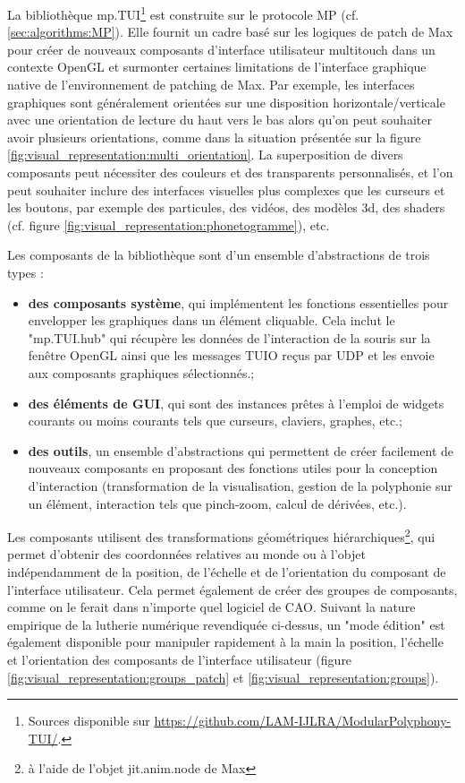 La bibliothèque mp.TUI\footnote{Sources disponible sur \url{https://github.com/LAM-IJLRA/ModularPolyphony-TUI/}.} est construite sur le protocole MP (cf. \ref{sec:algorithms:MP}). Elle fournit un cadre basé sur les logiques de patch de Max pour créer de nouveaux composants d'interface utilisateur multitouch dans un contexte OpenGL et surmonter certaines limitations de l'interface graphique native de l'environnement de patching de Max. Par exemple, les interfaces graphiques sont généralement orientées sur une disposition horizontale/verticale avec une orientation de lecture du haut vers le bas alors qu'on peut souhaiter avoir plusieurs orientations, comme dans la situation présentée sur la figure \ref{fig:visual_representation:multi_orientation}. La superposition de divers composants peut nécessiter des couleurs et des transparents personnalisés, et l'on peut souhaiter inclure des interfaces visuelles plus complexes que les curseurs et les boutons, par exemple des particules, des vidéos, des modèles 3d, des shaders (cf. figure \ref{fig:visual_representation:phonetogramme}), etc.

Les composants de la bibliothèque sont d'un ensemble d'abstractions de trois types :
\vspace{-1em}
\begin{itemize}[noitemsep]
	\item \textbf{des composants système}, qui implémentent les fonctions essentielles pour envelopper les graphiques dans un élément cliquable. Cela inclut le "mp.TUI.hub" qui récupère les données de l'interaction de la souris sur la fenêtre OpenGL ainsi que les messages TUIO reçus par UDP et les envoie aux composants graphiques sélectionnés.;
	\item \textbf{des éléments de GUI}, qui sont des instances prêtes à l'emploi de widgets courants ou moins courants tels que curseurs, claviers, graphes, etc.;
	\item \textbf{des outils}, un ensemble d'abstractions qui permettent de créer facilement de nouveaux composants en proposant des fonctions utiles pour la conception d'interaction (transformation de la visualisation, gestion de la polyphonie sur un élément, interaction tels que pinch-zoom, calcul de dérivées, etc.).
\end{itemize}

Les composants utilisent des transformations géométriques hiérarchiques\footnote{à l'aide de l'objet jit.anim.node de Max}, qui permet d'obtenir des coordonnées relatives au monde ou à l'objet indépendamment de la position, de l'échelle et de l'orientation du composant de l'interface utilisateur. Cela permet également de créer des groupes de composants, comme on le ferait dans n'importe quel logiciel de CAO. Suivant la nature empirique de la lutherie numérique revendiquée ci-dessus, un "mode édition" est également disponible pour manipuler rapidement à la main la position, l'échelle et l'orientation des composants de l'interface utilisateur (figure \ref{fig:visual_representation:groups_patch} et \ref{fig:visual_representation:groups}).

